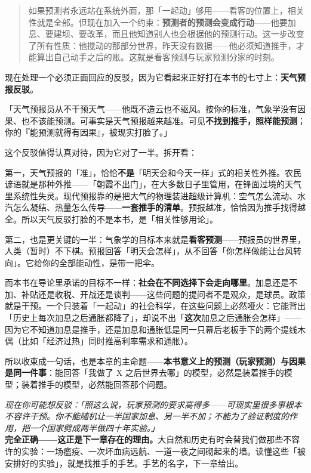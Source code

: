 \documentclass[../../main2.tex]{subfiles}
\begin{document}
	\begin{quote}
		如果预测者永远站在系统外面，那「一起动」够用——看客的位置上，相关性就是全部。但现在加入一个约束：\textbf{预测者的预测会变成行动}——他要加息、要建坝、要改革，而且他知道别人也会根据他的预测行动。这一步改变了所有性质：他搅动的那部分世界，昨天没有数据——他必须知道推手，才能算出自己动手之后的账。这就是看客预测与玩家预测分家的时刻。
	\end{quote}

	现在处理一个必须正面回应的反驳，因为它看起来正好打在本书的七寸上：\textbf{天气预报反驳}。

	「天气预报员从不干预天气——他既不造云也不驱风。按你的标准，气象学没有因果、也不该能预测。可事实是天气预报越来越准。可见\textbf{不找到推手，照样能预测}；你的『能预测就得有因果』，被现实打脸了。」

	这个反驳值得认真对待，因为它对了一半。拆开看：

	第一，天气预报的「准」，恰恰\textbf{不是}「明天会和今天一样」式的相关性外推。农民谚语就是那种外推——「朝霞不出门」，在大多数日子里管用，在锋面过境的天气里系统性失灵。现代预报靠的是把大气的物理装进超级计算机：空气怎么流动、水汽怎么凝结、热量怎么传导——\textbf{一套推手的清单}。预报越准，恰恰因为推手找得越全。所以天气反驳打脸的不是本书，是「相关性够用论」。

	第二，也是更关键的一半：气象学的目标本来就是\textbf{看客预测}——预报员的世界里，人类（暂时）不下棋。预报回答「明天会怎样」，从不回答「你怎样做能让台风转向」。它给你的全部能动性，是带一把伞。

	而本书在导论里承诺的目标不一样：\textbf{社会在不同选择下会走向哪里}。加息还是不加、补贴还是收税、开战还是谈判——这些问题的提问者不是观众，是球员。政策就是干预。一个只装着「一起动」的社会科学，在这些问题上必然哑火：它能背出「历史上每次加息之后通胀都降了」，却说不出「\textbf{这次}加息之后通胀会怎样」——因为它不知道加息是推手，还是加息和通胀低是同一只幕后老板手下的两个提线木偶（比如「经济过热」同时推高利率需求和通胀）。

	所以收束成一句话，也是本章的主命题——\textbf{本书意义上的预测（玩家预测）与因果是同一件事}：能回答「我做了 X 之后世界去哪」的模型，必然是装着推手的模型；装着推手的模型，必然能回答那个问题。

	\begin{questionbox}
		\textit{现在你可能想反驳：「照这么说，玩家预测的要求高得多——可现实里很多事根本不容许干预。你不能随机让一半国家加息、另一半不加；不能为了验证制度的作用，把一个国家劈成两半做四十年实验。」}\\
		\textbf{完全正确——这正是下一章存在的理由。}大自然和历史有时会替我们做那些不容许的实验：一场瘟疫、一次坏血病远航、一道一夜之间砌起来的墙。读懂这些「被安排好的实验」，就是找推手的手艺。手艺的名字，下一章给出。
	\end{questionbox}
\end{document}
